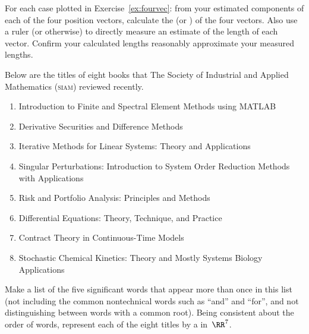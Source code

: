 \begin{exercise} \label{ex:} 
For each case plotted in Exercise~\ref{ex:fourvec}:
from your estimated components of each of the four position vectors, calculate the  (or ) of the four vectors. 
Also use a ruler (or otherwise) to directly measure an estimate of the length of each vector.
Confirm your calculated lengths reasonably approximate your measured lengths.
\end{exercise}



\begin{exercise} \label{ex:8siambks} 
Below are the titles of eight books that The Society of Industrial and Applied Mathematics (\textsc{siam}) reviewed recently.
\begin{enumerate}
\item Introduction to Finite and Spectral Element Methods using MATLAB
\item Derivative Securities and Difference Methods 
\item Iterative Methods for Linear Systems: Theory and Applications 
\item Singular Perturbations: Introduction to System Order Reduction Methods with Applications 
\item Risk and Portfolio Analysis: Principles and Methods 
\item Differential Equations: Theory, Technique, and Practice 
\item Contract Theory in Continuous-Time Models 
\item Stochastic Chemical Kinetics: Theory and Mostly Systems Biology Applications
\end{enumerate}
Make a list of the five significant words that appear more than once in this list (not including the common nontechnical words such as ``and'' and ``for'', and not distinguishing between words with a common root).
Being consistent about the order of words, represent each of the eight titles by a  in~\(\RR^7\).

\end{exercise}




\begin{comment}%
why, what caused X?
how did X occur?
what-if? what-if-not?
how does X compare with Y?
what is the evidence for X?
why is X important?
\end{comment}





